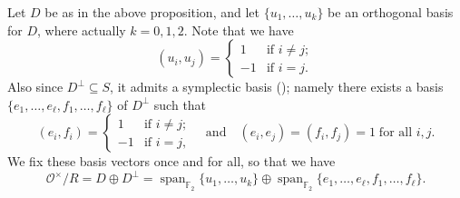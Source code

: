 \documentclass[10pt, letterpaper]{amsart}
\theoremstyle{plain}
\theoremstyle{definition}
\numberwithin{equation}{section}
\newcommand{\F}{\mathbb{F}}
\newcommand{\Span}{\operatorname{span}}
\newcommand{\Ocal}{\mathcal{O}}
\newcommand{\qand}{{\quad\text{and}\quad}}
\begin{document}
Let $D$ be as in the above proposition, and let $\{u_1,\dots,u_k\}$ be an orthogonal basis for $D$, where actually $k=0, 1, 2$. Note that we have
\begin{equation*}
(u_i, u_j)=\begin{cases}1&\text{if $i\neq j$};\\
-1&\text{if $i=j$}.\end{cases}
\end{equation*}
Also since $D^\perp\subseteq S$, it admits a symplectic basis (\cite[Theorem 1.2.1]{Kitaoka}); namely there exists a basis $\{e_1,\dots, e_{\ell}, f_1,\dots, f_{\ell}\}$ of $D^\perp$ such that
\[
(e_i, f_i)=\begin{cases}1&\text{if $i\neq j$};\\
-1&\text{if $i=j$},\end{cases}
\qand
(e_i, e_j)=(f_i, f_j)=1\; \text{for all $i, j$}.
\]
We fix these basis vectors once and for all, so that we have
\[
\Ocal^\times\slash R=D\oplus D^\perp=\Span_{\F_2}\{u_1,\dots,u_k\}\oplus\Span_{\F_2}\{e_1,\dots,e_\ell, f_1,\dots,f_\ell\}.
\]
\end{document}
